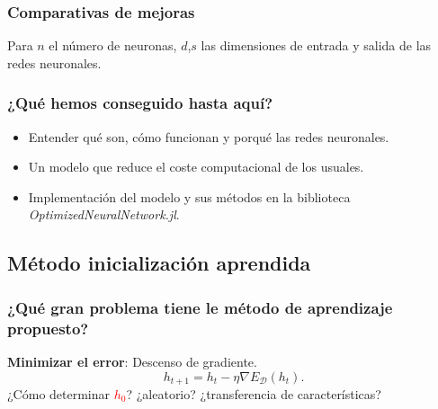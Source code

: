 \documentclass{beamer}
\begin{document}
\begin{frame}
    \frametitle{Comparativas de mejoras}
    \begin{table}[h]
        \centering
        \caption{Comparativas de coste computacional en evaluación entre la implementación usual de una red neuronal y la nuestra}
        \label{tab:comparativas coste red neuronal }
    \end{table}
    Para $n$ el número de neuronas, $d$,$s$ las dimensiones de entrada y salida de las redes neuronales. 
\end{frame}
\begin{frame}
    \frametitle{¿Qué hemos conseguido hasta aquí?}
    \begin{itemize}
        \item Entender qué son, cómo funcionan y porqué las redes neuronales.
        \item Un modelo que reduce el coste computacional de los usuales.
        \item Implementación del modelo y sus métodos en la biblioteca 
        \textit{OptimizedNeuralNetwork.jl}.
    \end{itemize}
    

\end{frame}


\subsection{Método inicialización aprendida}
\begin{frame}
    \frametitle{¿Qué gran problema tiene le método de aprendizaje propuesto?} 
       \textbf{Minimizar el error}: Descenso de gradiente. 
        \begin{equation*}
            h_{t+1}  = h_t - \eta \nabla E_{\mathcal{D}}(h_t).
        \end{equation*} 
        \pause
        ¿Cómo determinar  \textcolor{red}{$h_0$}? 
        ¿aleatorio? ¿transferencia de características?
\end{frame}
\end{document}
